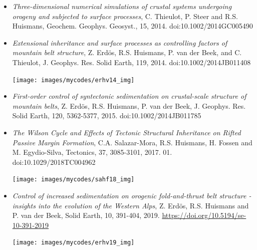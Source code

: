 \begin{itemize}
\item {\it Three-dimensional numerical simulations of crustal systems undergoing orogeny and subjected to surface processes}, 
C. Thieulot, P. Steer and R.S. Huismans, Geochem. Geophys. Geosyst., 15, 2014. doi:10.1002/2014GC005490

\item {\it Extensional inheritance and surface processes as controlling factors of mountain belt structure}, 
Z. Erd\"os, R.S. Huismans, P. van der Beek, and C. Thieulot, J. Geophys. Res. Solid Earth, 119, 2014. doi:10.1002/2014JB011408

\begin{center}
\texttt{[image: images/mycodes/erhv14\_img]}
\end{center}


\item {\it First-order control of syntectonic sedimentation on crustal-scale structure of mountain belts}, 
Z. Erd\"os, R.S. Huismans, P. van der Beek, J. Geophys. Res. Solid Earth, 120, 5362-5377, 2015. doi:10.1002/2014JB011785



\item {\it The Wilson Cycle and Effects of Tectonic Structural Inheritance
on Rifted Passive Margin Formation}, C.A. Salazar-Mora, R.S. Huismans, H. Fossen and M. Egydio-Silva, 
Tectonics, 37, 3085-3101, 2017. 01. doi:10.1029/2018TC004962 

\begin{center}
\texttt{[image: images/mycodes/sahf18\_img]}
\end{center}


\item {\it Control of increased sedimentation on orogenic fold-and-thrust belt structure - 
insights into the evolution of the Western Alps}, 
Z. Erd\"os, R.S. Huismans and P. van der Beek, Solid Earth, 10, 391-404, 2019.
\url{https://doi.org/10.5194/se-10-391-2019}

\begin{center}
\texttt{[image: images/mycodes/erhv19\_img]}
\end{center}


\end{itemize}
